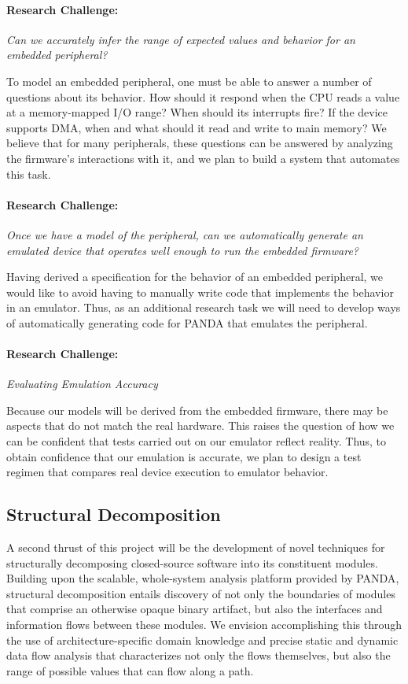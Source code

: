 \documentclass[letterpaper,twoside,11pt,headings=small]{scrartcl}
\newcommand{\dynamicsys}{\textsc{PANDA}\xspace}
\newcommand{\challenge}[1]{\paragraph{Research Challenge:} \emph{#1}}
\begin{document}
\challenge{Can we accurately infer the range of expected values and
behavior for an embedded peripheral?}

To model an embedded peripheral, one must be able to answer a number of
questions about its behavior. How should it respond when the CPU reads a value
at a memory-mapped I/O range? When should its interrupts fire? If the device
supports DMA, when and what should it read and write to main memory? We
believe that for many peripherals, these questions can be answered by
analyzing the firmware's interactions with it, and we plan to build a system
that automates this task.

\challenge{Once we have a model of the peripheral, can we automatically
generate an emulated device that operates well enough to run the embedded firmware?}

Having derived a specification for the behavior of an embedded peripheral, we
would like to avoid having to manually write code that implements the behavior
in an emulator. Thus, as an additional research task we will need to develop
ways of automatically generating code for \dynamicsys that emulates the
peripheral.

\challenge{Evaluating Emulation Accuracy}

Because our models will be derived from the embedded firmware, there may be
aspects that do not match the real hardware. This raises the question of how
we can be confident that tests carried out on our emulator reflect reality.
Thus, to obtain confidence that our emulation is accurate, we plan to design a
test regimen that compares real device execution to emulator behavior.

\subsection{Structural Decomposition}
\label{sec:overview:structure}

A second thrust of this project will be the development of novel techniques
for structurally decomposing closed-source software into its constituent
modules.  Building upon the scalable, whole-system analysis platform provided
by \dynamicsys, structural decomposition entails discovery of not only the
boundaries of modules that comprise an otherwise opaque binary artifact, but
also the interfaces and information flows between these modules.  We envision
accomplishing this through the use of architecture-specific domain knowledge
and precise static and dynamic data flow analysis that characterizes not only
the flows themselves, but also the range of possible values that can flow along
a path.
\end{document}
